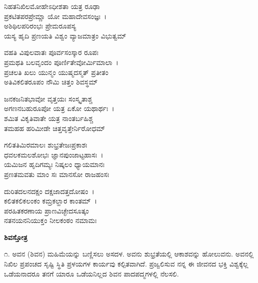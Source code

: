 
\begin{myquote}
ನಿಹತನಿಖಿಲಮೋಹೇಽಧೀಶತಾ ಯತ್ರ ರೂಢಾ\\ಪ್ರಕಟಿತಪರಪ್ರೇಮ್ಣಾ ಯೋ ಮಹಾದೇವಸಂಜ್ಞಃ~।\\ಅಶಿಥಿಲಪರಿರಂಭಃ ಪ್ರೇಮರೂಪಸ್ಯ\\ಯಸ್ಯ ಹೃದಿ ಪ್ರಣಯತಿ ವಿಶ್ವಂ ವ್ಯಾಜಮಾತ್ರಂ ವಿಭುತ್ವಮ್
\end{myquote}


\begin{myquote}
ವಹತಿ ವಿಪುಲವಾತಃ ಪೂರ್ವಸಂಸ್ಕಾರ ರೂಪಃ\\ಪ್ರಮಥತಿ ಬಲವೃಂದಂ ಪೂರ್ಣಿತೇವೋರ್ಮಿಮಾಲಾ~।\\ಪ್ರಚಲತಿ ಖಲು ಯುನ್ಮಂ ಯುಷ್ಮದಸ್ಮತ್ ಪ್ರತೀತಂ\\ಅತಿವಿಕಲಿತರೂಪಂ ನೌಮಿ ಚಿತ್ತಂ ಶಿವಸ್ಥಮ್
\end{myquote}


\begin{myquote}
ಜನಕಜನಿತಭಾವೋ ವೃತ್ತಯಃ ಸಂಸ್ಕೃತಾಶ್ಚ\\ಅಗಣನಬಹುರೂಪೋ ಯತ್ರ ಏಕೋ ಯಥಾರ್ಥಃ~।\\ಶಮಿತ ವಿಕೃತಿವಾತೇ ಯತ್ರ ನಾಂತರ್ಬಹಿಶ್ಚ\\ತಮಹಹ ಹರಿಮೀಡೇ ಚಿತ್ತವೃತ್ತೇರ್ನಿರೋಧಮ್
\end{myquote}


\begin{myquote}
ಗಲಿತತಿಮಿರಮಾಲಃ ಶುಭ್ರತೇಜಃಪ್ರಕಾಶಃ\\ಧವಲಕಮಲಶೋಭಃ ಜ್ಞಾನಪುಂಜಾಟ್ಟಹಾಸಃ~।\\ಯಮಿಜನ ಹೃದಿಗಮ್ಯಃ ನಿಷ್ಕಲಂ ಧ್ಯಾಯಮಾನಃ\\ಪ್ರಣತಮವತು ಮಾಂ ಸಃ ಮಾನಸೋ ರಾಜಹಂಸಃ
\end{myquote}


\begin{myquote}
ದುರಿತದಲನದಕ್ಷಂ ದಕ್ಷಜಾದತ್ತದೋಷಂ~।\\ಕಲಿತಕಲಿಕಲಂಕಂ ಕಮ್ರಕಲ್ಹಾರ ಕಾಂತಮ್~।\\ಪರಹಿತಕರಣಾಯ ಪ್ರಾಣವಿಚ್ಛೇದಸೂತ್ಕಂ\\ನತನಯನನಿಯುಕ್ತಂ ನೀಲಕಂಠಂ ನಮಾಮಃ
\end{myquote}


\begin{center}
\textbf{ಶಿವಸ್ತೋತ್ರ}
\end{center}

೧. ಅವನ (ಶಿವನ) ಮಹಿಮೆಯನ್ನು ಬಣ್ಣಿಸಲು ಅಸದಳ. ಅವನು ಶುಭ್ರತೆಯಲ್ಲಿ ಆಕಾಶವನ್ನು ಹೋಲುವನು. ಅವನಲ್ಲಿ ನಿಖಿಲ ಪ್ರಪಂಚದ ಸೃಷ್ಟಿ ಸ್ಥಿತಿ ಪ್ರಳಯಗಳ ಕಾರ್ಯವು ಕಲ್ಪಿತವಾಗಿದೆ. ಪ್ರಜ್ವಲಿಸುವ ನನ್ನ ಈ ಜೀವನದ ಭಕ್ತಿ ವಿಶ್ವಕ್ಕೆಲ್ಲ ಒಡೆಯನಾದರೂ ತನಗೆ ಯಾರೂ ಒಡೆಯನಿಲ್ಲದ ಶಿವನ ಪಾದಪದ್ಮಗಳಲ್ಲಿ ನೆಲಸಲಿ.

